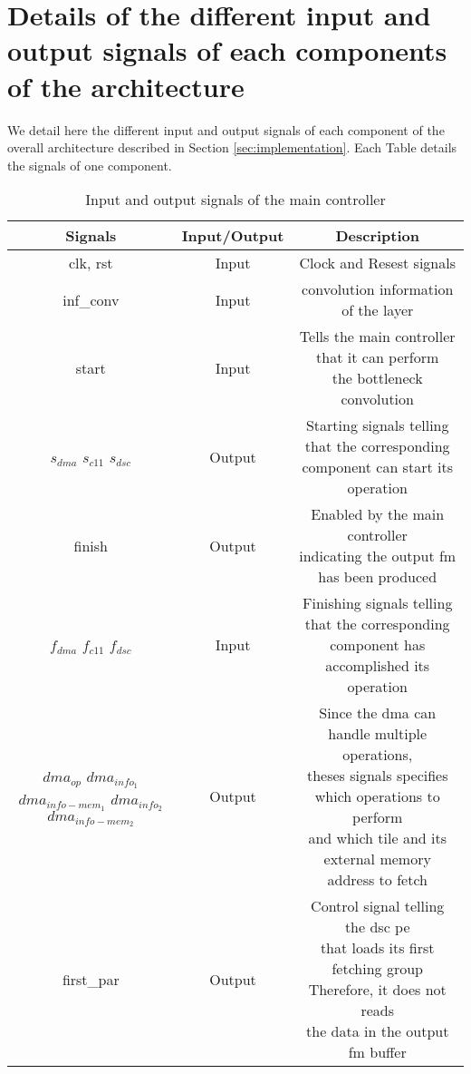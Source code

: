 \chapter{Details of the different input and output signals of each components of the architecture} \label{appendix:sig}
We detail here the different input and output signals of each component of the overall architecture described in Section \ref{sec:implementation}. Each Table details the signals of one component.
%
\begin{table}[H]
    \begin{tabular}{c|c|c}
        Signals & Input/Output & Description \\
        \hline \hline
        clk, rst & Input & Clock and Resest signals \\
        \hline
        inf\_conv & Input & convolution information of the layer\\
        \hline
        start & Input & \makecell{Tells the main controller that it can perform \\ the bottleneck convolution} \\
        \hline
        \makecell{$s_{dma}$ \\$s_{c11}$\\$s_{dsc}$} & Output & \makecell{Starting signals telling that the corresponding \\ component can start its operation}\\
        \hline
        finish & Output & \makecell{Enabled by the main controller \\ indicating the output \acrshort{fm} has been produced}\\
        \hline
        \makecell{$f_{dma}$ \\$f_{c11}$\\$f_{dsc}$} & Input & \makecell{Finishing signals telling that the corresponding \\ component has accomplished its operation}\\
        \hline
        \makecell{$dma_{op}$\\$dma_{info_1}$\\$dma_{info-mem_1}$\\$dma_{info_2}$\\$dma_{info-mem_2}$} & Output & \makecell{Since the \acrshort{dma} can handle multiple operations,\\ theses signals specifies which operations to perform \\ and which tile and its external memory address to fetch}\\
        \hline
        first\_par & Output & \makecell{Control signal telling the \acrshort{dsc} \acrshort{pe} \\ that loads its first fetching group \\ Therefore, it does not reads \\ the data in the output \acrshort{fm} buffer} \\
        \hline \hline
    \end{tabular}
    \caption{Input and output signals of the main controller}
    \label{tab:mc_sig}
\end{table}
